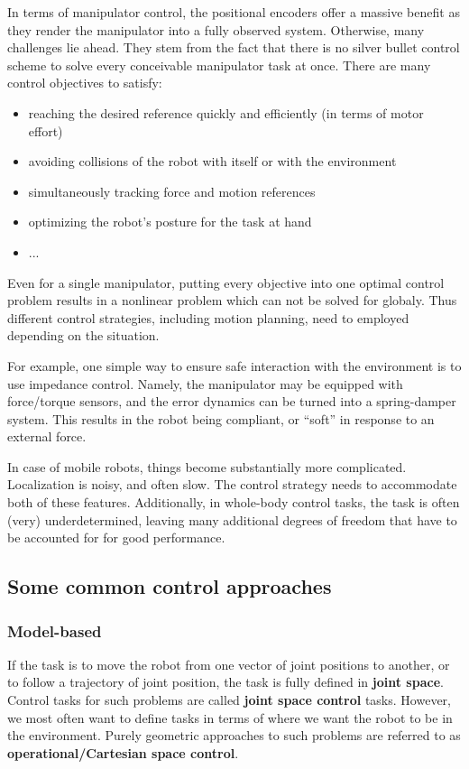 In terms of manipulator control, the positional encoders
offer a massive benefit as they render the manipulator into
a fully observed system.
Otherwise, many challenges lie ahead.
They stem from the fact that there is no silver bullet control
scheme to solve every conceivable manipulator task at once.
There are many control objectives to satisfy:
\begin{itemize}
\item reaching the desired reference quickly and efficiently 
	(in terms of motor effort)
\item avoiding collisions of the robot with itself or with the environment
\item simultaneously tracking force and motion references
\item optimizing the robot's posture for the task at hand
\item ...
\end{itemize}
Even for a single manipulator, putting every objective
into one optimal control problem results in a nonlinear problem
which can not be solved for globaly.
Thus different control strategies, including motion planning,
need to employed depending on the situation. 

For example, one simple way to ensure safe interaction with the environment
is to use impedance control.
Namely, the manipulator may be equipped with force/torque sensors,
and the error dynamics can be turned into a spring-damper system.
This results in the robot being compliant, or ``soft'' in
response to an external force.

In case of mobile robots, things become substantially more complicated.
Localization is noisy, and often slow. The control strategy
needs to accommodate both of these features.
Additionally, in whole-body control tasks,
the task is often (very) underdetermined, leaving
many additional degrees of freedom that have to be accounted
for for good performance.


\subsection{Some common control approaches}
\subsubsection{Model-based}
If the task is to move the robot from one vector
of joint positions to another, or to follow a trajectory
of joint position, the task is fully defined
in \textbf{joint space}.
Control tasks for such problems are called
\textbf{joint space control} tasks.
However, we most often want to define tasks in terms of 
where we want the robot to be in the environment.
Purely geometric approaches to such problems
are referred to as 
\textbf{operational/Cartesian space control}.

